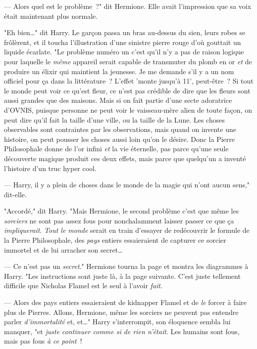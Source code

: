 --- Alors quel est le problème~?" dit Hermione. Elle avait l'impression que sa voix était maintenant plus normale.

"Eh bien…" dit Harry. Le garçon passa un bras au-dessus du sien, leurs robes se frôlèrent, et il toucha l'illustration d'une sinistre pierre rouge d'où gouttait un liquide écarlate. "Le problème numéro un c'est qu'il n'y a pas de raison logique pour laquelle le \emph{même} appareil serait capable de transmuter du plomb en or \emph{et} de produire un élixir qui maintient la jeunesse. Je me demande s'il y a un nom officiel pour ça dans la littérature~? L'effet 'monte jusqu'à 11', peut-être~? Si tout le monde peut voir ce qu'est fleur, ce n'est pas crédible de dire que les fleurs sont aussi grandes que des maisons. Mais si on fait partie d'une secte adoratrice d'OVNIS, puisque personne ne peut voir le vaisseau-mère alien de toute façon, on peut dire qu'il fait la taille d'une ville, ou la taille de la Lune. Les choses observables sont contraintes par les observations, mais quand on invente une histoire, on peut pousser les choses aussi loin qu'on le désire. Donc la Pierre Philosophale donne de l'or infini \emph{et} la vie éternelle, pas parce qu'une seule découverte magique produit ces deux effets, mais parce que quelqu'un a inventé l'histoire d'un truc hyper cool.

--- Harry, il y a plein de choses dans le monde de la magie qui n'ont aucun sens," dit-elle.

"Accordé," dit Harry. "Mais Hermione, le second problème c'est que même les \emph{sorciers} ne sont pas assez fous pour nonchalamment laisser passer ce que ça \emph{impliquerait}. \emph{Tout le monde} serait en train d'essayer de redécouvrir le formule de la Pierre Philosophale, des \emph{pays} entiers essaieraient de capturer ce sorcier immortel et de lui arracher son secret…

--- Ce n'est pas un \emph{secret}." Hermione tourna la page et montra les diagrammes à Harry. "Les instructions sont juste là, à la page suivante. C'est juste tellement difficile que Nicholas Flamel est le seul à l'avoir \emph{fait}.

--- Alors des pays entiers essaieraient de kidnapper Flamel et de \emph{le} forcer à faire plus de Pierres. Allons, Hermione, même les sorciers ne peuvent pas entendre parler \emph{d'immortalité} et, et…" Harry s'interrompit, son éloquence sembla lui manquer, "et \emph{juste continuer comme si de rien n'était}. Les humains sont fous, mais pas fous \emph{à ce point}~!

